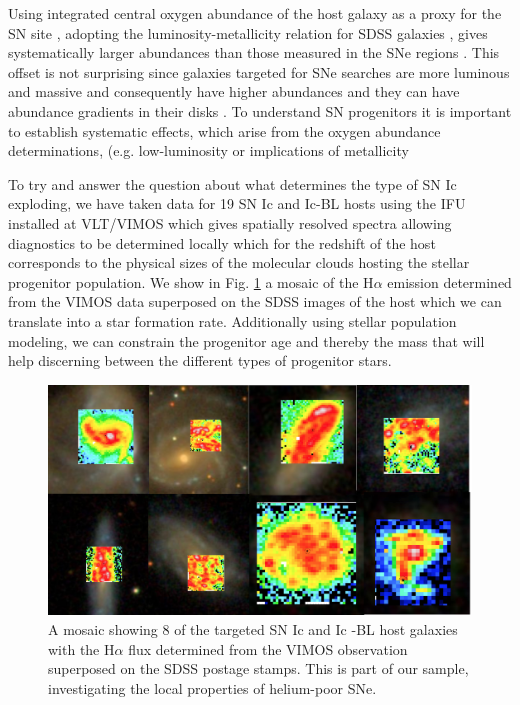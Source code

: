 Using integrated central oxygen abundance of the host
galaxy as a proxy for the
SN site \citep{Prieto2008, Kelly2012}, adopting the
luminosity-metallicity
relation for SDSS galaxies \citep{Tremonti2004}, gives
systematically larger
abundances than those measured in the SNe regions \citep{Modjaz2011}.
This
offset is not surprising since galaxies targeted for SNe searches
are more
luminous and massive and consequently have higher abundances
and they can have
abundance gradients in their disks \citep{Sanders2012}.
To understand SN progenitors it is important to establish
systematic effects, which arise from the oxygen abundance
determinations,
(e.g. low-luminosity or
implications of metallicity

To try and answer the question about what determines the type of SN Ic
exploding, we have taken data for 19 SN Ic and Ic-BL hosts using the IFU
installed at VLT/VIMOS which gives spatially resolved spectra allowing
diagnostics
to be determined locally which for the redshift of the host
corresponds to the
physical sizes of the molecular clouds hosting the stellar
progenitor
population. We show in Fig. \ref{fig:intro:snifu} a mosaic of the
H$\alpha$
emission determined from the VIMOS data superposed on the SDSS images
of the
host which we can translate into a star formation rate. Additionally
using
stellar population modeling, we can constrain the progenitor age and
thereby the
mass that will help discerning between the different types of
progenitor stars. 



\begin{figure}[htb]
	
	\includegraphics[width=\textwidth]{gfx/ifu}
	
	\caption{A mosaic showing 8 of the targeted SN Ic and Ic -BL host galaxies with the H$\alpha$ flux determined from the VIMOS observation superposed on the SDSS postage stamps. This is part of our sample, investigating the local properties of helium-poor SNe. }
	
	\label{fig:intro:snifu}
\end{figure}

